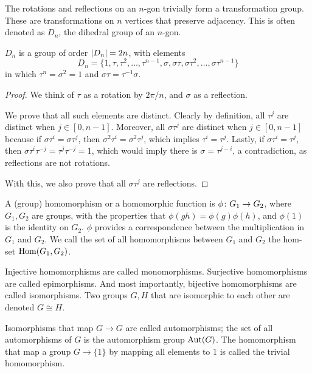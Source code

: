 \begin{definition}
    The rotations and reflections on an \(n\)-gon
    trivially form a transformation group.
    These are transformations on \(n\) vertices that preserve adjacency.
    This is often denoted as \(D_n\),
    the dihedral group of an \(n\)-gon.
\end{definition}
\begin{proposition}
    \(D_n\) is a group of order \(\abs{D_n} = 2n\),
    with elements
    \begin{equation*}
        D_n = \{1,\tau,\tau^2,\hdots,\tau^{n-1},
        \sigma,\sigma\tau,\sigma\tau^2,\hdots,\sigma\tau^{n-1}\}
    \end{equation*}
    in which \(\tau^n = \sigma^2 = 1\)
    and \(\sigma\tau = \tau^{-1}\sigma\).
\end{proposition}
\begin{proof}
    We think of \(\tau\) as a rotation by \(2\pi/n\),
    and \(\sigma\) as a reflection.

    We prove that all such elements are distinct.
    Clearly by definition,
    all \(\tau^j\) are distinct when \(j \in [0,n-1]\).
    Moreover, all \(\sigma\tau^j\) are distinct when \(j \in [0,n-1]\)
    because if \(\sigma\tau^i = \sigma\tau^j\),
    then \(\sigma^2\tau^i = \sigma^2\tau^j\),
    which implies \(\tau^i = \tau^j\).
    Lastly, if \(\sigma\tau^i = \tau^j\),
    then \(\sigma\tau^i\tau^{-j} = \tau^j\tau^{-j} = 1\),
    which would imply there is \(\sigma = \tau^{j-i}\),
    a contradiction,
    as reflections are not rotations.

    With this, we also prove that all \(\sigma\tau^j\)
    are reflections.
\end{proof}

\begin{definition}
    A (group) homomorphism or a homomorphic function
    is \(\phi\colon G_1\to G_2\),
    where \(G_1,G_2\) are groups,
    with the properties that \(\phi(gh) = \phi(g)\phi(h)\),
    and \(\phi(1)\) is the identity on \(G_2\).
    \(\phi\) provides a correspondence
    between the multiplication in \(G_1\) and \(G_2\).
    We call the set of all homomorphisms between \(G_1\) and \(G_2\)
    the hom-set \(\operatorname{Hom}(G_1,G_2)\).
\end{definition}
\begin{definition}
    Injective homomorphisms are called monomorphisms.
    Surjective homomorphisms are called epimorphisms.
    And most importantly,
    bijective homomorphisms are called isomorphisms.
    Two groups \(G,H\) that are isomorphic to each other
    are denoted \(G \cong H\).
\end{definition}
\begin{definition}
    Isomorphisms that map \(G \to G\) are called automorphisms;
    the set of all automorphisms of \(G\) is the automorphism group \(\operatorname{Aut}(G)\).
    The homomorphism that map a group \(G \to \{1\}\)
    by mapping all elements to \(1\)
    is called the trivial homomorphism.
\end{definition}

